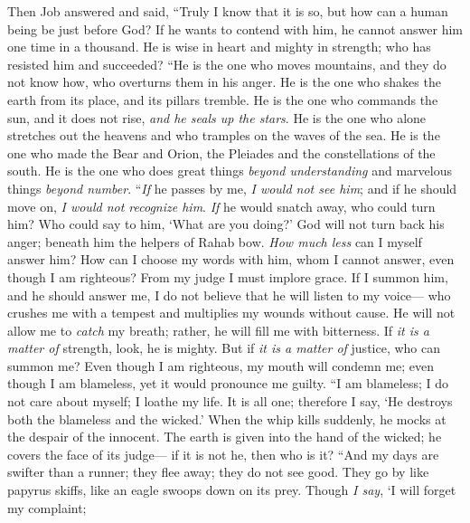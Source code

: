 \begin{biblechapter} %
 Then Job answered and said,
\verse “Truly I know that it is so, 
but how can a human being be just before God?
\verse If he wants to contend with him, 
he cannot answer him one time in a thousand.
\verse He is wise in heart and mighty in strength; 
who has resisted him and succeeded?
\verse “He is the one who moves mountains, and they do not know how, 
who overturns them in his anger.
\verse He is the one who shakes the earth from its place, 
and its pillars tremble.
\verse He is the one who commands the sun, and it does not rise, 
\textit{and he seals up the stars}.
\verse He is the one who alone stretches out the heavens 
and who tramples on the waves of the sea.
\verse He is the one who made the Bear and Orion, 
the Pleiades and the constellations of the south.
\verse He is the one who does great things \textit{beyond understanding} 
and marvelous things \textit{beyond number}.
\verse “\textit{If} he passes by me, \textit{I would not see him}; 
and if he should move on, \textit{I would not recognize him}.
\verse \textit{If} he would snatch away, who could turn him? 
Who could say to him, ‘What are you doing?’
\verse God will not turn back his anger; 
beneath him the helpers of Rahab bow.
\verse \textit{How much less} can I myself answer him? 
How can I choose my words with him,
\verse whom I cannot answer, even though I am righteous? 
From my judge I must implore grace.
\verse If I summon him, and he should answer me, 
I do not believe that he will listen to my voice—
\verse who crushes me with a tempest 
and multiplies my wounds without cause.
\verse He will not allow me to \textit{catch} my breath; 
rather, he will fill me with bitterness.
\verse If \textit{it is a matter of} strength, look, he is mighty. 
But if \textit{it is a matter of} justice, who can summon me?
\verse Even though I am righteous, my mouth will condemn me; 
even though I am blameless, yet it would pronounce me guilty.
\verse “I am blameless; I do not care about myself; 
I loathe my life.
\verse It is all one; therefore I say, 
‘He destroys both the blameless and the wicked.’
\verse When the whip kills suddenly, 
he mocks at the despair of the innocent.
\verse The earth is given into the hand of the wicked; 
he covers the face of its judge— 
if it is not he, then who is it?
\verse “And my days are swifter than a runner; 
they flee away; they do not see good.
\verse They go by like papyrus skiffs, 
like an eagle swoops down on its prey.
\verse Though \textit{I say}, ‘I will forget my complaint; 

\end{biblechapter}
